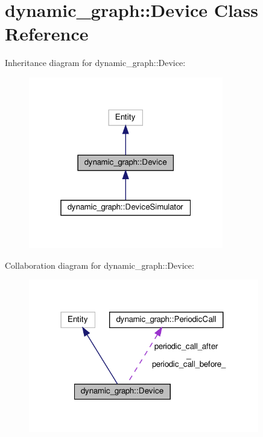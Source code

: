 \hypertarget{classdynamic__graph_1_1Device}{}\section{dynamic\+\_\+graph\+:\+:Device Class Reference}
\label{classdynamic__graph_1_1Device}


Inheritance diagram for dynamic\+\_\+graph\+:\+:Device\+:
\nopagebreak
\begin{figure}[H]
\begin{center}
\leavevmode
\includegraphics[width=241pt]{classdynamic__graph_1_1Device__inherit__graph}
\end{center}
\end{figure}


Collaboration diagram for dynamic\+\_\+graph\+:\+:Device\+:
\nopagebreak
\begin{figure}[H]
\begin{center}
\leavevmode
\includegraphics[width=285pt]{classdynamic__graph_1_1Device__coll__graph}
\end{center}
\end{figure}
